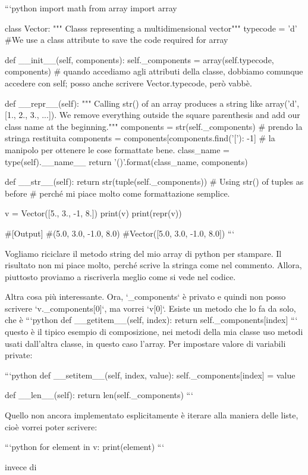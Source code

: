 \documentclass[10pt, a4paper, twosided, titlepage, draft]{book}
\begin{document}
```python
import math
from array import array

class Vector:
""" Classs representing a multidimensional vector"""
typecode = ’d’ #We use a class attribute to save the code required for array

def __init__(self, components):
self._components = array(self.typecode, components)
# quando accediamo agli attributi della classe, dobbiamo comunque accedere con self; posso anche scrivere Vector.typecode, però vabbè.

def __repr__(self):
""" Calling str() of an array produces a string like
array(’d’, [1., 2., 3., ...]). We remove everything outside the
square parenthesis and add our class name at the beginning."""
components = str(self._components) # prendo la stringa restituita
components = components[components.find(’[’): -1] # la manipolo per ottenere le cose formattate bene.
class_name = type(self).__name__
return ’{}({})’.format(class_name, components)

def __str__(self):
return str(tuple(self._components)) # Using str() of tuples as before
# perché mi piace molto come formattazione semplice.

v = Vector([5., 3., -1, 8.])
print(v)
print(repr(v))

#[Output]
#(5.0, 3.0, -1.0, 8.0)
#Vector([5.0, 3.0, -1.0, 8.0])
```

Vogliamo riciclare il metodo string del mio array di python per stampare. Il risultato non mi piace molto, perché scrive la stringa come nel commento. Allora, piuttosto proviamo a riscriverla meglio come si vede nel codice.

Altra cosa più interessante. Ora, `_components` è privato e quindi non posso scrivere `v._components[0]`, ma vorrei `v[0]`. Esiste un metodo che lo fa da solo, che è 
```python
def __getitem__(self, index):
return self._components[index]
```
questo è il tipico esempio di composizione, nei metodi della mia classe uso metodi usati dall'altra classe, in questo caso l'array.
Per impostare valore di variabili private:

```python
def __setitem__(self, index, value):
self._components[index] = value

def __len__(self):
return len(self._components)
```

Quello non ancora implementato esplicitamente è iterare alla maniera delle liste, cioè vorrei poter scrivere:

```python
for element in v: 
print(element)
```

invece di 
\end{document}
